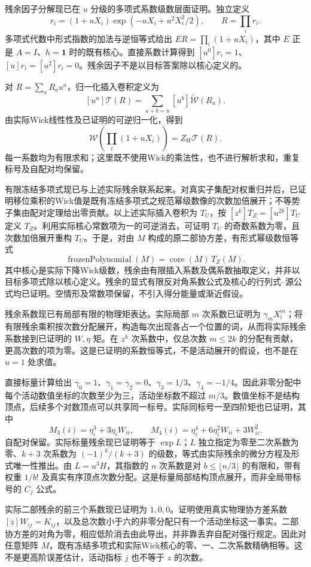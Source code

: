 \documentclass[UTF8,11pt,fontset=fandol]{ctexart}
\begin{document}
残余因子分解现已在 $u$ 分级的多项式系数级数层面证明。独立定义
\[
 r_i=(1+uX_i)\exp(-uX_i+u^2X_i^2/2),\qquad R=\prod_i r_i.
\]
多项式代数中形式指数的加法与逆恒等式给出 $ER=\prod_i(1+uX_i)$，其中 $E$ 正是 $A=I$、$h=\mathbf1$ 时的既有核心。直接系数计算得到 $[u^0]r_i=1$、$[u]r_i=[u^2]r_i=0$。残余因子不是以目标答案除以核心定义的。

对 $R=\sum_aR_au^a$，归一化插入卷积定义为
\[
 [u^n]\mathcal T(R)=\sum_{a+b=n}[u^b]\widetilde{\mathcal W}(R_a).
\]
由实际Wick线性性及已证明的可逆归一化，得到
\[
 \mathcal W\!\left(\prod_i(1+uX_i)\right)=Z_W\mathcal T(R).
\]
每一系数均为有限求和；这里既不使用Wick的乘法性，也不进行解析求和，重复标号及自配对均保留。

有限冻结多项式现已与上述实际残余联系起来。对真实子集配对权重归并后，已证明移位乘积的Wick值是既有冻结多项式之规范幂级数像的次数加倍展开；不等势子集由配对定理给出零贡献。以上述实际插入卷积为 $T_U$，按 $[z^k]T_Z=[u^{2k}]T_U$ 定义 $T_Z$。利用实际核心常数项为一的可逆消去，可证明 $T_U$ 的奇数系数为零，且次数加倍展开重构 $T_U$。于是，对由 $M$ 构成的原二部协方差，有形式幂级数恒等式
\[
 \operatorname{frozenPolynomial}(M)=\operatorname{core}(M)\,T_Z(M).
\]
其中核心是实际下降Wick级数，残余由有限插入系数及偶系数抽取定义，并非以目标多项式除以核心定义。残余的显式有限反对角系数公式及核心的行列式–源公式均已证明。空情形及常数项保留，不引入得分能量或渐近假设。

残余系数现已有局部有限的物理矩表达。实际局部 $m$ 次系数已证明为 $\gamma_mX_i^m$；将有限残余乘积按次数分配展开，构造每次出现各占一个位置的词，从而将实际残余系数接到已证明的 $W,\eta$ 矩。在 $z^k$ 次系数中，仅总次数 $m\le2k$ 的分配有贡献，更高次数的项为零。这是已证明的系数恒等式，不是活动展开的假设，也不是在 $u=1$ 处求值。

直接标量计算给出 $\gamma_0=1$、$\gamma_1=\gamma_2=0$、$\gamma_3=1/3$、$\gamma_4=-1/4$。因此非零分配中每个活动数值坐标的次数至少为三，活动坐标数不超过 $m/3$。数值坐标不是结构顶点，后续多个对数顶点可以共享同一标号。实际同标号一至四阶矩也已证明，其中
\[
 M_3(i)=\eta_i^3+3\eta_iW_{ii},\qquad
 M_4(i)=\eta_i^4+6\eta_i^2W_{ii}+3W_{ii}^2.
\]
自配对保留。实际标量残余现已证明等于 $\exp L$；$L$ 独立指定为零至二次系数为零、$k+3$ 次系数为 $(-1)^k/(k+3)$ 的级数，等式由实际残余的微分方程及形式唯一性推出。由 $L=u^3H$，其指数的 $n$ 次系数是对 $b\le\lfloor n/3\rfloor$ 的有限和，带有权重 $1/b!$ 及真实有序顶点次数分配。这是标量局部结构顶点展开，而非全局带标号的 $C_j$ 公式。

实际二部残余的前三个系数现已证明为 $1,0,0$。证明使用真实物理协方差系数 $[z]W_{ij}=K_{ij}$，以及总次数小于六的非零分配只有一个活动坐标这一事实。二部协方差的对角为零，相应低阶消去由此导出，并非靠丢弃自配对强行规定。因此对任意矩阵 $M$，既有冻结多项式和实际Wick核心的零、一、二次系数精确相等。这不是更高阶误差估计，活动指标 $j$ 也不等于 $z$ 的次数。
\end{document}
